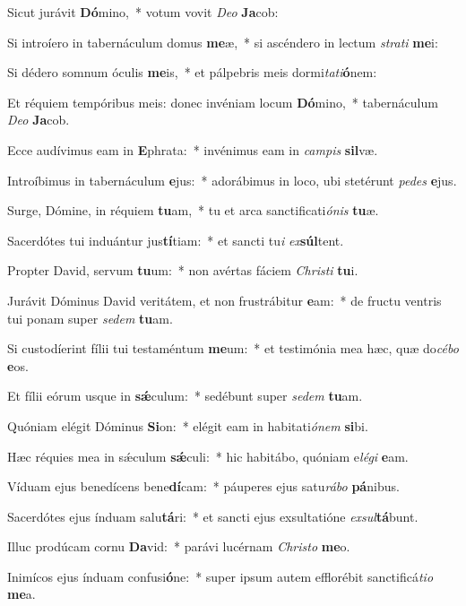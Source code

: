 \item Sicut jurávit \textbf{Dó}mino,~* votum vovit \textit{De}\textit{o} \textbf{Ja}cob:
\item Si introíero in tabernáculum domus \textbf{me}æ,~* si ascéndero in lectum \textit{stra}\textit{ti} \textbf{me}i:
\item Si dédero somnum óculis \textbf{me}is,~* et pálpebris meis dormi\textit{ta}\textit{ti}\textbf{ó}nem:
\item Et réquiem tempóribus meis: donec invéniam locum \textbf{Dó}mino,~* tabernáculum \textit{De}\textit{o} \textbf{Ja}cob.
\item Ecce audívimus eam in \textbf{E}phrata:~* invénimus eam in \textit{cam}\textit{pis} \textbf{sil}væ.
\item Introíbimus in tabernáculum \textbf{e}jus:~* adorábimus in loco, ubi stetérunt \textit{pe}\textit{des} \textbf{e}jus.
\item Surge, Dómine, in réquiem \textbf{tu}am,~* tu et arca sanctificati\textit{ó}\textit{nis} \textbf{tu}æ.
\item Sacerdótes tui induántur jus\textbf{tí}tiam:~* et sancti tu\textit{i} \textit{ex}\textbf{súl}tent.
\item Propter David, servum \textbf{tu}um:~* non avértas fáciem \textit{Chris}\textit{ti} \textbf{tu}i.
\item Jurávit Dóminus David veritátem, et non frustrábitur \textbf{e}am:~* de fructu ventris tui ponam super \textit{se}\textit{dem} \textbf{tu}am.
\item Si custodíerint fílii tui testaméntum \textbf{me}um:~* et testimónia mea hæc, quæ do\textit{cé}\textit{bo} \textbf{e}os.
\item Et fílii eórum usque in \textbf{sǽ}culum:~* sedébunt super \textit{se}\textit{dem} \textbf{tu}am.
\item Quóniam elégit Dóminus \textbf{Si}on:~* elégit eam in habitati\textit{ó}\textit{nem} \textbf{si}bi.
\item Hæc réquies mea in sǽculum \textbf{sǽ}culi:~* hic habitábo, quóniam e\textit{lé}\textit{gi} \textbf{e}am.
\item Víduam ejus benedícens bene\textbf{dí}cam:~* páuperes ejus satu\textit{rá}\textit{bo} \textbf{pá}nibus.
\item Sacerdótes ejus índuam salu\textbf{tá}ri:~* et sancti ejus exsultatióne \textit{ex}\textit{sul}\textbf{tá}bunt.
\item Illuc prodúcam cornu \textbf{Da}vid:~* parávi lucérnam \textit{Chris}\textit{to} \textbf{me}o.
\item Inimícos ejus índuam confusi\textbf{ó}ne:~* super ipsum autem efflorébit sanctificá\textit{ti}\textit{o} \textbf{me}a.
